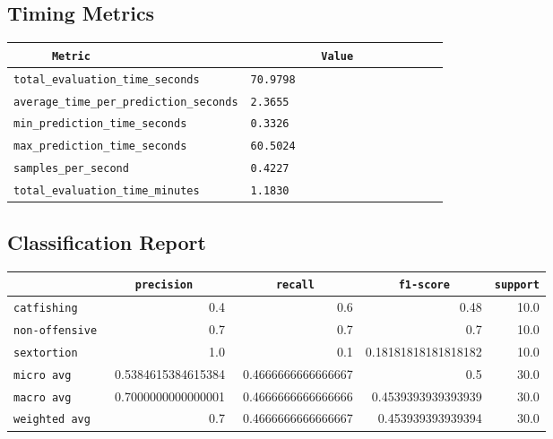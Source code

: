 \documentclass{article}
\begin{document}
\subsection{Timing Metrics}

\begin{center}
\begin{tabular}{l | l} \hline
    \verb|      Metric     | & \verb|           Value           | \\ \hline
    \hline
    \verb|total_evaluation_time_seconds| & \verb|70.9798                      | \\ \hline
    \verb|average_time_per_prediction_seconds| & \verb|2.3655                       | \\ \hline
    \verb|min_prediction_time_seconds| & \verb|0.3326                       | \\ \hline
    \verb|max_prediction_time_seconds| & \verb|60.5024                      | \\ \hline
    \verb|samples_per_second| & \verb|0.4227                       | \\ \hline
    \verb|total_evaluation_time_minutes| & \verb|1.1830                       | \\ \hline
\end{tabular}
\end{center}

\subsection{Classification Report}

\begin{center}
\begin{tabular}{l | r | r | r | r} \hline
    \verb|            | & \verb|    precision     | & \verb|      recall      | & \verb|     f1-score     | & \verb|support| \\ \hline
    \hline
    \verb|catfishing | & 0.4 & 0.6 & 0.48 &    10.0 \\ \hline
    \verb|non-offensive| & 0.7 & 0.7 & 0.7 &    10.0 \\ \hline
    \verb|sextortion | & 1.0 & 0.1 & 0.18181818181818182 &    10.0 \\ \hline
    \verb|micro avg  | & 0.5384615384615384 & 0.4666666666666667 & 0.5 &    30.0 \\ \hline
    \verb|macro avg  | & 0.7000000000000001 & 0.4666666666666666 & 0.4539393939393939 &    30.0 \\ \hline
    \verb|weighted avg| & 0.7 & 0.4666666666666667 & 0.453939393939394 &    30.0 \\ \hline
\end{tabular}
\end{center}
\end{document}
